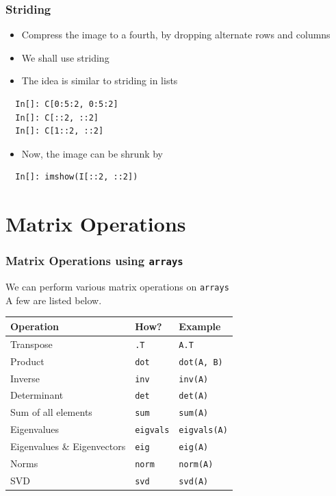 \begin{frame}[fragile]
  \frametitle{Striding}
  \begin{itemize}
  \item Compress the image to a fourth, by dropping alternate rows and
    columns
  \item We shall use striding
  \item The idea is similar to striding in lists
  \end{itemize}
  \begin{lstlisting}
  In[]: C[0:5:2, 0:5:2]
  In[]: C[::2, ::2]
  In[]: C[1::2, ::2]
  \end{lstlisting}
  \begin{itemize}
  \item Now, the image can be shrunk by
  \end{itemize}
  \begin{lstlisting}
  In[]: imshow(I[::2, ::2])
  \end{lstlisting}
\end{frame}

\section{Matrix Operations}

\begin{frame}[fragile]
  \frametitle{Matrix Operations using \texttt{arrays}}
  We can perform various matrix operations on \texttt{arrays}\\ 
  A few are listed below.

  \begin{center}
    \begin{tabular}{lll}
      Operation                    &  How?           &  Example           \\
      \hline
      Transpose                    &  \texttt{.T}       &  \texttt{A.T}         \\
      Product                      &  \texttt{dot}      &  \texttt{dot(A, B)}   \\
      Inverse                      &  \texttt{inv}      &  \texttt{inv(A)}      \\
      Determinant                  &  \texttt{det}      &  \texttt{det(A)}      \\
      Sum of all elements          &  \texttt{sum}      &  \texttt{sum(A)}      \\
      Eigenvalues                  &  \texttt{eigvals}  &  \texttt{eigvals(A)}  \\
      Eigenvalues \& Eigenvectors  &  \texttt{eig}      &  \texttt{eig(A)}      \\
      Norms                        &  \texttt{norm}     &  \texttt{norm(A)}     \\
      SVD                          &  \texttt{svd}      &  \texttt{svd(A)}      \\
    \end{tabular}
  \end{center}
\end{frame}

